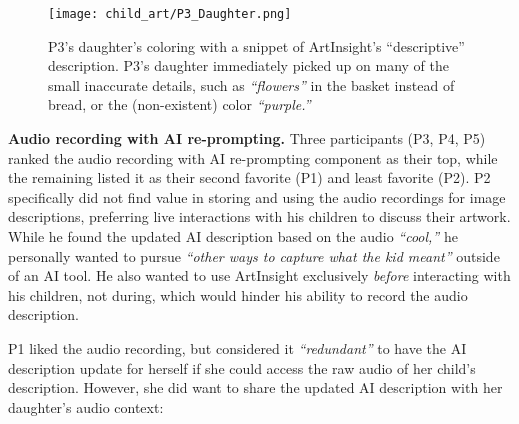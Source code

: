 \documentclass[sigconf]{acmart}
\begin{document}
\begin{figure*}[h]
\centering
\texttt{[image: child\_art/P3\_Daughter.png]}
\caption{P3's daughter's coloring with a snippet of ArtInsight's ``descriptive'' description. P3's daughter immediately picked up on many of the small inaccurate details, such as \textit{``flowers''} in the basket instead of bread, or the (non-existent) color \textit{``purple.''}}
\label{P3Daughter}
\vspace{-1em}
\end{figure*}

\textbf{Audio recording with AI re-prompting.} Three participants (P3, P4, P5) ranked the audio recording with AI re-prompting component as their top, while the remaining listed it as their second favorite (P1) and least favorite (P2). P2 specifically did not find value in storing and using the audio recordings for image descriptions, preferring live interactions with his children to discuss their artwork. While he found the updated AI description based on the audio \textit{``cool,''} he personally wanted to pursue \textit{``other ways to capture what the kid meant''} outside of an AI tool. He also wanted to use ArtInsight exclusively \textit{before} interacting with his children, not during, which would hinder his ability to record the audio description.

P1 liked the audio recording, but considered it \textit{``redundant''} to have the AI description update for herself if she could access the raw audio of her child's description. However, she did want to share the updated AI description with her daughter's audio context:
\end{document}
